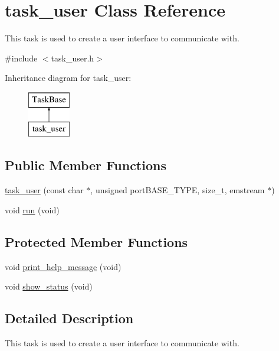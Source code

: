 \hypertarget{classtask__user}{}\section{task\+\_\+user Class Reference}
\label{classtask__user}


This task is used to create a user interface to communicate with.  




{\ttfamily \#include $<$task\+\_\+user.\+h$>$}

Inheritance diagram for task\+\_\+user\+:\begin{figure}[H]
\begin{center}
\leavevmode
\includegraphics[height=2.000000cm]{classtask__user}
\end{center}
\end{figure}
\subsection*{Public Member Functions}
\begin{DoxyCompactItemize}
\item 
\mbox{\hyperlink{classtask__user_a3aba77563b375bb14838800608da48bc}{task\+\_\+user}} (const char $\ast$, unsigned port\+B\+A\+S\+E\+\_\+\+T\+Y\+PE, size\+\_\+t, emstream $\ast$)
\item 
void \mbox{\hyperlink{classtask__user_adca6429d57be25e8d411414fc8ad75af}{run}} (void)
\end{DoxyCompactItemize}
\subsection*{Protected Member Functions}
\begin{DoxyCompactItemize}
\item 
void \mbox{\hyperlink{classtask__user_a75475060f83bae1e44bcc8a5c34015c7}{print\+\_\+help\+\_\+message}} (void)
\item 
void \mbox{\hyperlink{classtask__user_a105bebbd9cb1031154c3dfc3662db4a0}{show\+\_\+status}} (void)
\end{DoxyCompactItemize}


\subsection{Detailed Description}
This task is used to create a user interface to communicate with. 

